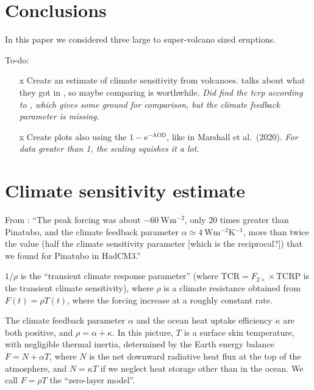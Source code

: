 \documentclass{ametsocV5}
\begin{document}
\section{Conclusions}


In this paper we considered three large to super-volcano sized eruptions.

\clearpage

To-do:

\begin{itemize}
  \item[\lbrack{}x\rbrack{}] Create an estimate of climate sensitivity from
    volcanoes. \citet{gregory2016} talks about what they got in \citet{jones2005}, so
    maybe comparing is worthwhile. \emph{Did find the \acrshort{tcrp} according to
      \citet{merlis2014}, which gives some ground for comparison, but the climate
      feedback parameter is missing.}
  \item[\lbrack{}x\rbrack{}] Create plots also using the
    \(1-\mathrm{e}^{-\mathrm{AOD}}\), like in Marshall et al.\ (2020). \emph{For data
      greater than 1, the scaling squishes it a lot.}
\end{itemize}

\section*{Climate sensitivity estimate}

From \citet{gregory2016}: ``The peak forcing was about \(\SI{-60}{\watt\metre^{-2}}\),
only \(20\) times greater than Pinatubo, and the climate feedback parameter \(\alpha
\simeq \SI{4}{\watt\metre^{-2}\kelvin^{-1}}\), more than twice the value (half the
climate sensitivity parameter [which is the reciprocal?]) that we found for Pinatubo in
HadCM3.''

\(1/\rho \) is the ``transient climate response parameter'' (where
\(\mathrm{TCR}=F_{2\times}\times \mathrm{TCRP}\) is the transient climate sensitivity),
where \(\rho \) is a climate resistance obtained from \(F(t)=\rho T(t)\), where the
forcing increase at a roughly constant rate.

The climate feedback parameter \(\alpha\) and the ocean heat uptake efficiency
\(\kappa\) are both positive, and \(\rho =\alpha +\kappa \). In this picture, \(T\) is a
surface skin temperature, with negligible thermal inertia, determined by the Earth
energy balance \(F=N+\alpha T\), where \(N\) is the net downward radiative heat flux at
the top of the atmosphere, and \(N=\kappa T\) if we neglect heat storage other than in
the ocean. We call \(F=\rho T\) the ``zero-layer model''.
\end{document}
